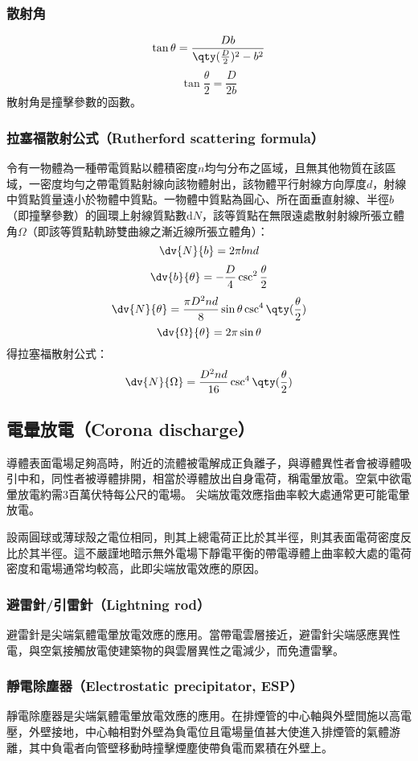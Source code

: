 \documentclass[a4paper,12pt]{report}
\begin{document}
\begin{itemize}
\subsubsection{散射角}
\[\tan\theta=\frac{Db}{\qty(\frac{D}{2})^2-b^2}\]
\[\tan\frac{\theta}{2}=\frac{D}{2b}\]
散射角是撞擊參數的函數。
\subsubsection{拉塞福散射公式（Rutherford scattering formula）}
令有一物體為一種帶電質點以體積密度$n$均勻分布之區域，且無其他物質在該區域，一密度均勻之帶電質點射線向該物體射出，該物體平行射線方向厚度$d$，射線中質點質量遠小於物體中質點。一物體中質點為圓心、所在面垂直射線、半徑$b$（即撞擊參數）的圓環上射線質點數$\mathrm{d}N$，該等質點在無限遠處散射射線所張立體角$\Omega$（即該等質點軌跡雙曲線之漸近線所張立體角）：
\[\dv{N}{b}=2\pi bnd\]
\[\dv{b}{\theta}=-\frac{D}{4}\csc^2\frac{\theta}{2}\]
\[\dv{N}{\theta}=\frac{\pi D^2nd}{8}\sin\theta\csc^4\qty(\frac{\theta}{2})\]
\[\dv{\Omega}{\theta}=2\pi\sin\theta\]
得拉塞福散射公式：
\[\dv{N}{\Omega}=\frac{D^2nd}{16}\csc^4\qty(\frac{\theta}{2})\]
\subsection{電暈放電（Corona discharge）}
導體表面電場足夠高時，附近的流體被電解成正負離子，與導體異性者會被導體吸引中和，同性者被導體排開，相當於導體放出自身電荷，稱電暈放電。空氣中欲電暈放電約需3百萬伏特每公尺的電場。
尖端放電效應指曲率較大處通常更可能電暈放電。

設兩圓球或薄球殼之電位相同，則其上總電荷正比於其半徑，則其表面電荷密度反比於其半徑。這不嚴謹地暗示無外電場下靜電平衡的帶電導體上曲率較大處的電荷密度和電場通常均較高，此即尖端放電效應的原因。
\subsubsection{避雷針/引雷針（Lightning rod）}
避雷針是尖端氣體電暈放電效應的應用。當帶電雲層接近，避雷針尖端感應異性電，與空氣接觸放電使建築物的與雲層異性之電減少，而免遭雷擊。
\subsubsection{靜電除塵器（Electrostatic precipitator, ESP）}
靜電除塵器是尖端氣體電暈放電效應的應用。在排煙管的中心軸與外壁間施以高電壓，外壁接地，中心軸相對外壁為負電位且電場量值甚大使進入排煙管的氣體游離，其中負電者向管壁移動時撞擊煙塵使帶負電而累積在外壁上。

\end{itemize}
\end{document}
